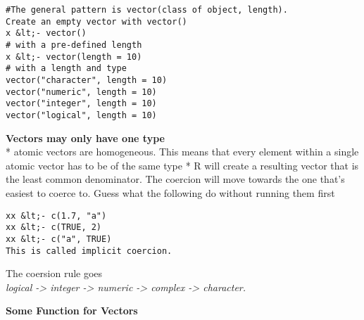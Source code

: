\documentclass[11pt]{article}
\begin{document}
    \begin{verbatim}
#The general pattern is vector(class of object, length). 
Create an empty vector with vector()
x &lt;- vector()
# with a pre-defined length
x &lt;- vector(length = 10)
# with a length and type
vector("character", length = 10)
vector("numeric", length = 10)
vector("integer", length = 10)
vector("logical", length = 10)
\end{verbatim}

    \textbf{Vectors may only have one type}\\
* atomic vectors are homogeneous. This means that every element within a
single atomic vector has to be of the same type * R will create a
resulting vector that is the least common denominator. The coercion will
move towards the one that's easiest to coerce to. Guess what the
following do without running them first

\begin{verbatim}
xx &lt;- c(1.7, "a")
xx &lt;- c(TRUE, 2)
xx &lt;- c("a", TRUE)
This is called implicit coercion.
\end{verbatim}

The coersion rule goes\\
\emph{logical -\textgreater{} integer -\textgreater{} numeric
-\textgreater{} complex -\textgreater{} character.}

    \textbf{Some Function for Vectors}
\end{document}
